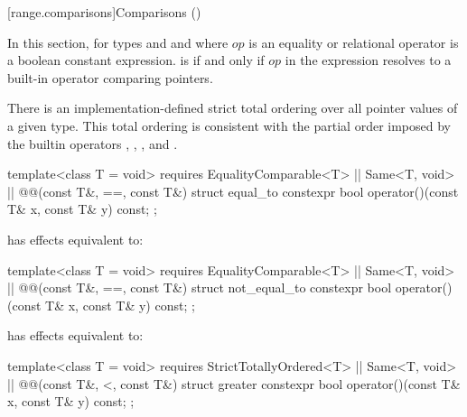 {\color{addclr}
\setcounter{subsection}{7}
[range.comparisons]{Comparisons ()}

\pnum
{}

\pnum
In this section,  for types 
and  and where $op$ is an equality or relational
operator is a boolean constant expression.
 is  if and only if $op$
in the expression  resolves to a built-in
operator comparing pointers.

\pnum
There is an implementation-defined strict total ordering over all pointer values
of a given type. This total ordering is consistent with the partial order imposed
by the builtin operators \tcode{<}, \tcode{>}, \tcode{<=}, and \tcode{>=}.

%
\begin{itemdecl}
template<class T = void>
  requires EqualityComparable<T> || Same<T, void> || @\textit{}@(const T&, ==, const T&)
struct equal_to {
  constexpr bool operator()(const T& x, const T& y) const;
};
\end{itemdecl}

\begin{itemdescr}
\pnum
{} has effects equivalent to: 
\end{itemdescr}

%
\begin{itemdecl}
template<class T = void>
  requires EqualityComparable<T> || Same<T, void> || @\textit{}@(const T&, ==, const T&)
struct not_equal_to {
  constexpr bool operator()(const T& x, const T& y) const;
};
\end{itemdecl}

\begin{itemdescr}
\pnum
{} has effects equivalent to: 
\end{itemdescr}

%
\begin{itemdecl}
template<class T = void>
  requires StrictTotallyOrdered<T> || Same<T, void> || @\textit{}@(const T&, <, const T&)
struct greater {
  constexpr bool operator()(const T& x, const T& y) const;
};
\end{itemdecl}

}
